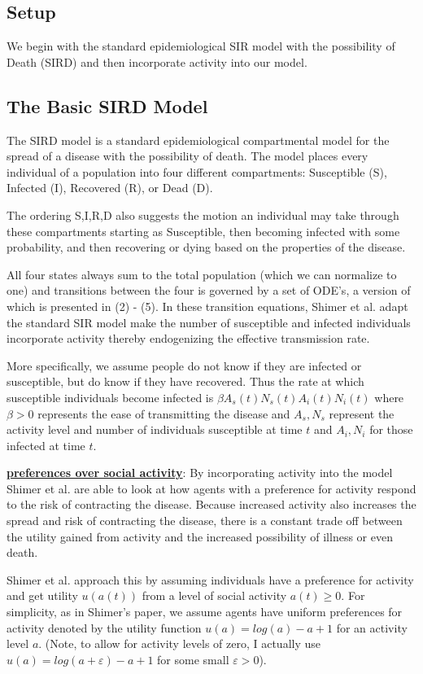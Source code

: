 \documentclass[12pt]{article}
\begin{document}
\subsection{Setup}
We begin with the standard epidemiological SIR model with the possibility of Death (SIRD) and then incorporate activity into our model.

\subsection{The Basic SIRD Model}
The SIRD model is a standard epidemiological compartmental model for the spread of a disease with the possibility of death. The model places every individual of a population into four different compartments:
Susceptible (S), Infected (I), Recovered (R), or Dead (D).

The ordering S,I,R,D also suggests the motion an individual may take through these compartments starting as
Susceptible, then becoming infected with some probability, and then recovering or dying based on the properties of the disease.

All four states always sum to the total population (which we can normalize to one) and transitions between the four is governed by a set of ODE's, a version of which is presented in (2) - (5). 
In these transition equations, Shimer et al. adapt the standard SIR model make the number of susceptible and infected individuals incorporate activity thereby endogenizing the effective transmission rate.

More specifically, we assume people do not know if they are infected or susceptible, but do know if they have recovered. Thus the rate at which susceptible individuals become infected is
$\beta A_s(t) N_s(t) A_i(t) N_i(t)$ where  $\beta > 0$ represents the ease of transmitting the disease and $A_s,N_s$ represent the activity level and number of individuals susceptible at time $t$ and
$A_i, N_i$ for those infected at time $t.$

\underline{\bf preferences over social activity}: By incorporating activity into the model Shimer et al. are able to look at how agents with a preference for activity respond to the 
risk of contracting the disease. Because increased activity also increases the spread and risk of contracting the disease, there is a constant trade off between the utility gained
from activity and the increased possibility of illness or even death. 

Shimer et al. approach this by assuming individuals have a preference for activity and get utility $u(a(t))$ from a level of social activity  $a(t) \geq 0$.
For simplicity, as in Shimer's paper, we 
assume agents have uniform preferences for activity denoted by the utility function $u(a) = log(a) - a + 1$ for an activity level $a.$ (Note, to allow for activity levels of zero, 
I actually use $u(a) = log(a+\varepsilon) - a + 1$ for some  small $\varepsilon > 0$).
\end{document}
